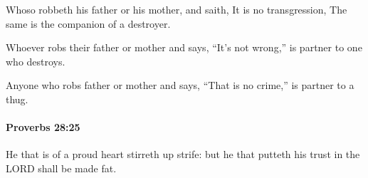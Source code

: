 			\begin{versebox}
					\item[BHS] 
					\item[ASV] Whoso robbeth his father or his mother, and saith, It is no transgression, The same is the companion of a destroyer.
					\item[NIV] Whoever robs their father or mother and says, “It’s not wrong,” is partner to one who destroys.
					\item[NRSV] Anyone who robs father or mother and says, “That is no crime,” is partner to a thug.
			\end{versebox}

		\paragraph{Proverbs 28:25} %
			\label{PROVERBS-28-25}

			He that is of a proud heart stirreth up strife: but he that putteth his trust in the LORD shall be made fat.

